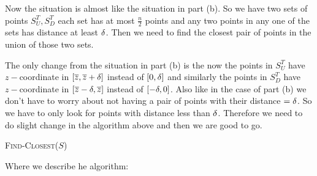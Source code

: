 \documentclass[a4paper, 11pt]{article}
\begin{document}
{\begin{enumerate}[label=(\alph*)]
Now the situation is almost like the situation in part (b). So we have two sets of points $S_U^T,S_D^T$ each set has at most  $\frac{n}{2}$ points and any two points in any one of the sets has distance at least $\delta$. Then we need to find the closest pair of points in the union of those two sets.

The only change from the situation in part (b) is the now the points in $S_U^T$ have $z-$coordinate   in $[\overline{z},\overline{z}+\delta]$ instead of $[0,\delta]$ and similarly the points in $S_D^T$ have $z-$coordinate in $[\overline{z}-\delta,\overline{z}]$ instead of $[-\delta,0]$. Also like in the case of part (b) we don't have to worry about not having a pair of points with their distance $=\delta$. So we have to only look for points with distance less than $\delta$. Therefore we need to do slight change in the algorithm above and then we are good to go.

\begin{algorithm}
	\DontPrintSemicolon
	
	\caption{\textsc{Find-Closest}($S$)}
	\label{find-closest-nlog2n}	
\end{algorithm}
Where we describe he  algorithm:


\end{enumerate}}
\end{document}
